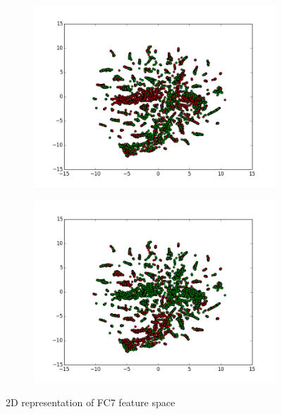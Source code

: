 \documentclass[twocolumn]{article}
\begin{document}
\begin{figure}[h]
    \centering
    \hfill
    \begin{subfigure}[b]{0.49\linewidth}
        \includegraphics[width=\linewidth]{images/analysis/17}
        \label{fig:keanu}
    \end{subfigure}
    \hfill
    \begin{subfigure}[b]{0.49\linewidth}
        \includegraphics[width=\linewidth]{images/analysis/34}
        \label{fig:nicole}
    \end{subfigure}
    \hfill
    \caption{2D representation of FC7 feature space}
    \label{fig:analysis}
\end{figure}
\end{document}
